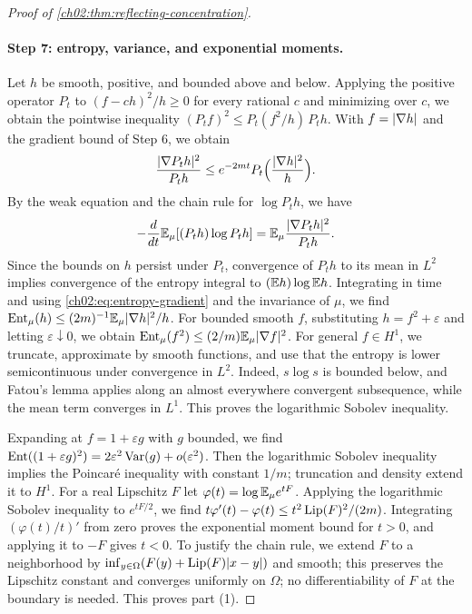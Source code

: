 \begin{proof}[Proof of \cref{ch02:thm:reflecting-concentration}]
\paragraph{Step 7: entropy, variance, and exponential moments.} Let $h$ be smooth, positive, and bounded above and below. Applying the positive operator $P_t$ to $(f-ch)^2/h\ge0$ for every rational $c$ and minimizing over $c$, we obtain the pointwise inequality $(P_tf)^2\le P_t(f^2/h)\,P_th$. With $f=\lvert \nabla h\rvert$ and the gradient bound of Step 6, we obtain
\begin{equation}\label{ch02:eq:entropy-gradient}
 \frac{\lvert \nabla P_th\rvert^2}{P_th}\le e^{-2mt}P_t\Bigl(\frac{\lvert \nabla h\rvert^2}{h}\Bigr).
\end{equation}
By the weak equation and the chain rule for $\log P_th$, we have
\[
 -\frac d{dt}\mathbb E_\mu[(P_th)\log P_th]=\mathbb E_\mu\frac{\lvert \nabla P_th\rvert^2}{P_th}.
\]
Since the bounds on $h$ persist under $P_t$, convergence of $P_th$ to its mean in $L^2$ implies convergence of the entropy integral to $(\mathbb E h)\log\mathbb E h$. Integrating in time and using \eqref{ch02:eq:entropy-gradient} and the invariance of $\mu$, we find $\operatorname{Ent}_\mu(h)\le(2m)^{-1}\mathbb E_\mu\lvert \nabla h\rvert^2/h$. For bounded smooth $f$, substituting $h=f^2+\varepsilon$ and letting $\varepsilon\downarrow0$, we obtain $\operatorname{Ent}_\mu(f^2)\le(2/m)\mathbb E_\mu\lvert \nabla f\rvert^2$. For general $f\in H^1$, we truncate, approximate by smooth functions, and use that the entropy is lower semicontinuous under convergence in $L^2$. Indeed, $s\log s$ is bounded below, and Fatou's lemma applies along an almost everywhere convergent subsequence, while the mean term converges in $L^1$. This proves the logarithmic Sobolev inequality.

Expanding at $f=1+\varepsilon g$ with $g$ bounded, we find $\operatorname{Ent}((1+\varepsilon g)^2)=2\varepsilon^2\operatorname{Var}(g)+o(\varepsilon^2)$. Then the logarithmic Sobolev inequality implies the Poincaré inequality with constant $1/m$; truncation and density extend it to $H^1$. For a real Lipschitz $F$ let $\varphi(t)=\log\mathbb E_\mu e^{tF}$. Applying the logarithmic Sobolev inequality to $e^{tF/2}$, we find $t\varphi'(t)-\varphi(t)\le t^2\operatorname{Lip}(F)^2/(2m)$. Integrating $(\varphi(t)/t)'$ from zero proves the exponential moment bound for $t>0$, and applying it to $-F$ gives $t<0$. To justify the chain rule, we extend $F$ to a neighborhood by $\inf_{y\in\Omega}(F(y)+\operatorname{Lip}(F)\lvert x-y\rvert)$ and smooth; this preserves the Lipschitz constant and converges uniformly on $\Omega$; no differentiability of $F$ at the boundary is needed. This proves part (1).


\end{proof}
